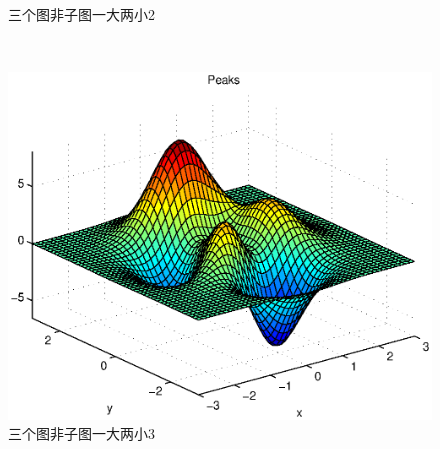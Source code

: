 \documentclass{article}
\begin{document}
\begin{figure}[!htbp]
\begin{minipage}[b]{0.4\textwidth}
\begin{minipage}[b]{\textwidth}
                \caption{三个图非子图一大两小2}
                \label{}
            \end{minipage}\\[0.8cm]%
            \begin{minipage}[b]{\textwidth}
                \centering
                \includegraphics[width=\textwidth]{example}
                \caption{三个图非子图一大两小3}		
                \label{}
            \end{minipage}	
        \end{minipage}
    \end{figure}
\end{document}
